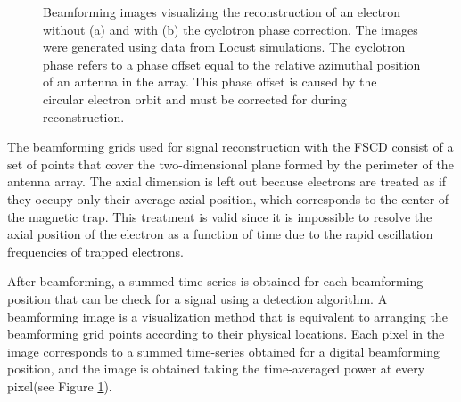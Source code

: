 \begin{figure}[htbp]
\begin{subfigure}{0.45\textwidth}
        \caption{}
    \end{subfigure}
    \caption{Beamforming images visualizing the reconstruction of an electron without (a) and with (b) the cyclotron phase correction. The images were generated using data from Locust simulations. The cyclotron phase refers to a phase offset equal to the relative azimuthal position of an antenna in the array. This phase offset is caused by the circular electron orbit and must be corrected for during reconstruction.}
    \label{fig:chap4-cyclotron-phase-bf-corr}
\end{figure}

The beamforming grids used for signal reconstruction with the FSCD consist of a set of points that cover the two-dimensional plane formed by the perimeter of the antenna array. The axial dimension is left out because electrons are treated as if they occupy only their average axial position, which corresponds to the center of the magnetic trap. This treatment is valid since it is impossible to resolve the axial position of the electron as a function of time due to the rapid oscillation frequencies of trapped electrons.

After beamforming, a summed time-series is obtained for each beamforming position that can be check for a signal using a detection algorithm. A beamforming image is a visualization method that is equivalent to arranging the beamforming grid points according to their physical locations. Each pixel in the image corresponds to a summed time-series obtained for a digital beamforming position, and the image is obtained taking the time-averaged power at every pixel(see Figure \ref{fig:chap4-cyclotron-phase-bf-corr}).%


